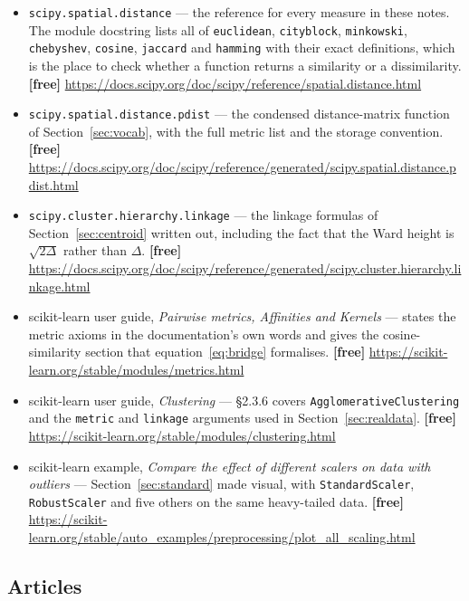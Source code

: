 \documentclass[11pt]{article}
\begin{document}
\begin{itemize}[leftmargin=*]
  \item \texttt{scipy.spatial.distance} --- the reference for every measure
    in these notes. The module docstring lists all of
    \texttt{euclidean}, \texttt{cityblock}, \texttt{minkowski},
    \texttt{chebyshev}, \texttt{cosine}, \texttt{jaccard} and
    \texttt{hamming} with their exact definitions, which is the place to
    check whether a function returns a similarity or a dissimilarity.
    \textbf{[free]}
    \url{https://docs.scipy.org/doc/scipy/reference/spatial.distance.html}
  \item \texttt{scipy.spatial.distance.pdist} --- the condensed
    distance-matrix function of Section~\ref{sec:vocab}, with the full metric
    list and the storage convention. \textbf{[free]}
    \url{https://docs.scipy.org/doc/scipy/reference/generated/scipy.spatial.distance.pdist.html}
  \item \texttt{scipy.cluster.hierarchy.linkage} --- the linkage formulas of
    Section~\ref{sec:centroid} written out, including the fact that the Ward
    height is $\sqrt{2\Delta}$ rather than $\Delta$. \textbf{[free]}
    \url{https://docs.scipy.org/doc/scipy/reference/generated/scipy.cluster.hierarchy.linkage.html}
  \item scikit-learn user guide, \emph{Pairwise metrics, Affinities and
    Kernels} --- states the metric axioms in the documentation's own words
    and gives the cosine-similarity section that
    equation~\eqref{eq:bridge} formalises. \textbf{[free]}
    \url{https://scikit-learn.org/stable/modules/metrics.html}
  \item scikit-learn user guide, \emph{Clustering} --- \S2.3.6 covers
    \texttt{AgglomerativeClustering} and the \texttt{metric} and
    \texttt{linkage} arguments used in Section~\ref{sec:realdata}.
    \textbf{[free]}
    \url{https://scikit-learn.org/stable/modules/clustering.html}
  \item scikit-learn example, \emph{Compare the effect of different scalers
    on data with outliers} --- Section~\ref{sec:standard} made visual, with
    \texttt{StandardScaler}, \texttt{RobustScaler} and five others on the
    same heavy-tailed data. \textbf{[free]}
    \url{https://scikit-learn.org/stable/auto_examples/preprocessing/plot_all_scaling.html}
\end{itemize}

\subsection*{Articles}
\end{document}
